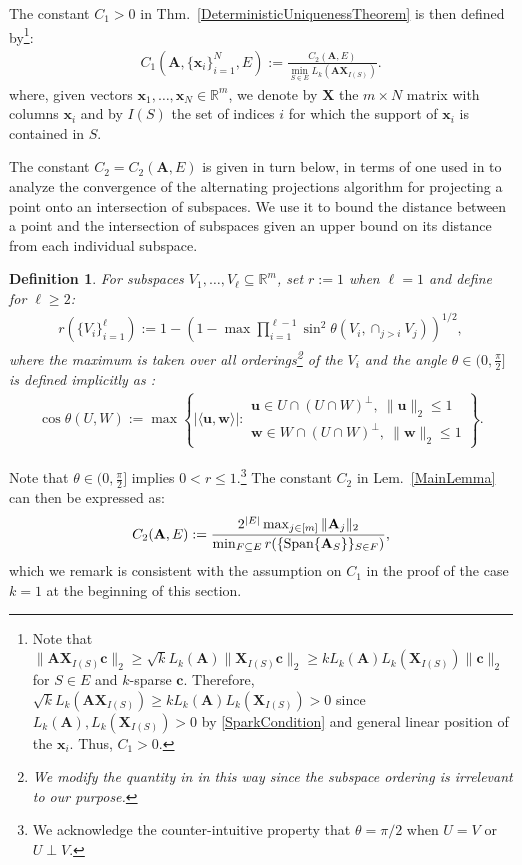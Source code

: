 \documentclass[9pt,twocolumn]{pnas-new}
\newtheorem{definition}{Definition}
\begin{document}
The constant $C_1 > 0$ in Thm.~\ref{DeterministicUniquenessTheorem} is then defined by\footnote{Note that $\|\mathbf{AX}_{I(S)}\mathbf{c}\|_2 \geq \sqrt{k} L_k(\mathbf{A})\|\mathbf{X}_{I(S)}\mathbf{c}\|_2 \geq k L_k(\mathbf{A}) L_k(\mathbf{X}_{I(S)})\|\mathbf{c}\|_2$ for $S \in E$ and $k$-sparse $\mathbf{c}$. Therefore, $\sqrt{k} L_k(\mathbf{AX}_{I(S)}) \geq k L_k(\mathbf{A}) L_k(\mathbf{X}_{I(S)}) > 0$ since $L_k(\mathbf{A}), L_k(\mathbf{X}_{I(S)}) > 0$ by \eqref{SparkCondition} and general linear position of the $\mathbf{x}_i$.  Thus, $C_1 > 0$.}:
\begin{align}\label{Cdef1}
C_1(\mathbf{A}, \{\mathbf{x}_i\}_{i=1}^N, E) := \frac{ C_2(\mathbf{A}, E) } { \min_{S \in E} L_k(\mathbf{AX}_{I(S)}) }.
\end{align}
where, given vectors $\mathbf{x}_1, \ldots, \mathbf{x}_N \in \mathbb{R}^m$, we denote by $\mathbf{X}$ the $m \times N$ matrix with columns $\mathbf{x}_i$ and by $I(S)$ the set of indices $i$ for which the support of $\mathbf{x}_i$ is contained in $S$.

The constant $C_2 = C_2(\mathbf{A}, E)$ is given in turn below, in terms of one used in \cite{Deutsch12} to analyze the convergence of the alternating projections algorithm for projecting a point onto an intersection of subspaces. 
We use it to bound the distance between a point and the intersection of subspaces given an upper bound on its distance from each individual subspace.

\begin{definition}\label{SpecialSupportSet}\label{FriedrichsDefinition}
For subspaces $V_1, \ldots, V_\ell \subseteq \mathbb{R}^m$, set $r := 1$ when $\ell = 1$ and define for $\ell \geq 2$:
\begin{align*}
r(\{V_i\}_{i=1}^\ell) := 1 - \left(1 -  \max \prod_{i=1}^{\ell-1} \sin^2  \theta \left(V_i, \cap_{j>i} V_j \right)  \right)^{1/2},
\end{align*} 
%
where the maximum is taken over all orderings\footnote{We modify the quantity in \cite{Deutsch12} in this way since the subspace ordering is irrelevant to our purpose.} of the $V_i$ and the angle $\theta \in (0,\frac{\pi}{2}]$ is defined implicitly as \cite[Def.~9.4]{Deutsch12}:
\begin{align*}
\cos{\theta(U,W)} := \max\left\{ |\langle \mathbf{u}, \mathbf{w} \rangle|: \substack{ \mathbf{u} \in U \cap (U \cap W)^\perp, \ \|\mathbf{u}\|_2 \leq 1 \\ \mathbf{w} \in W \cap (U \cap W)^\perp, \  \|\mathbf{w}\|_2 \leq 1 } \right\}.
\end{align*}
\end{definition}
Note that $\theta \in (0,\frac{\pi}{2}]$ implies $0 < r \leq 1$.\footnote{We acknowledge the counter-intuitive property that $\theta =  \pi/2$ when $U = V$ or $U \perp V$.}  
The constant $C_2$ in Lem.~\ref{MainLemma} can then be expressed as:  
\begin{align}\label{Cdef2}
C_2(\mathbf{A}, E) := \frac{ 2^{|E|} \max_{j \in [m]} \|\mathbf{A}_j\|_2}{ \min_{F \subseteq E} r( \{ \text{\rm Span}\{\mathbf{A}_{S}\} \}_{S \in F}) },
\end{align}
%
which we remark is consistent with the assumption on $C_1$ in the proof of the case $k=1$ at the beginning of this section.
\end{document}
